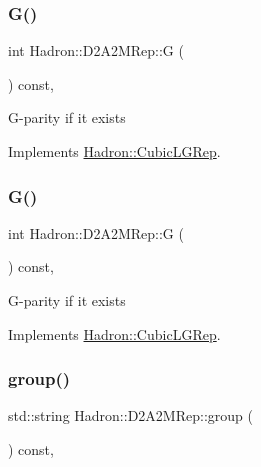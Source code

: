 \subsubsection{\texorpdfstring{G()}{G()}\hspace{0.1cm}{\footnotesize\ttfamily [2/3]}}
{\footnotesize\ttfamily int Hadron\+::\+D2\+A2\+M\+Rep\+::G (\begin{DoxyParamCaption}{ }\end{DoxyParamCaption}) const\hspace{0.3cm}{\ttfamily [inline]}, {\ttfamily [virtual]}}

G-\/parity if it exists 

Implements \mbox{\hyperlink{structHadron_1_1CubicLGRep_ace26f7b2d55e3a668a14cb9026da5231}{Hadron\+::\+Cubic\+L\+G\+Rep}}.

\mbox{\label{structHadron_1_1D2A2MRep_a2596fa94fc03bbceebf051143cfb14ea}} 
\subsubsection{\texorpdfstring{G()}{G()}\hspace{0.1cm}{\footnotesize\ttfamily [3/3]}}
{\footnotesize\ttfamily int Hadron\+::\+D2\+A2\+M\+Rep\+::G (\begin{DoxyParamCaption}{ }\end{DoxyParamCaption}) const\hspace{0.3cm}{\ttfamily [inline]}, {\ttfamily [virtual]}}

G-\/parity if it exists 

Implements \mbox{\hyperlink{structHadron_1_1CubicLGRep_ace26f7b2d55e3a668a14cb9026da5231}{Hadron\+::\+Cubic\+L\+G\+Rep}}.

\mbox{\label{structHadron_1_1D2A2MRep_a93c34b277f64808d5863a7b292bbb888}} 
\subsubsection{\texorpdfstring{group()}{group()}\hspace{0.1cm}{\footnotesize\ttfamily [1/3]}}
{\footnotesize\ttfamily std\+::string Hadron\+::\+D2\+A2\+M\+Rep\+::group (\begin{DoxyParamCaption}{ }\end{DoxyParamCaption}) const\hspace{0.3cm}{\ttfamily [inline]}, {\ttfamily [virtual]}}

